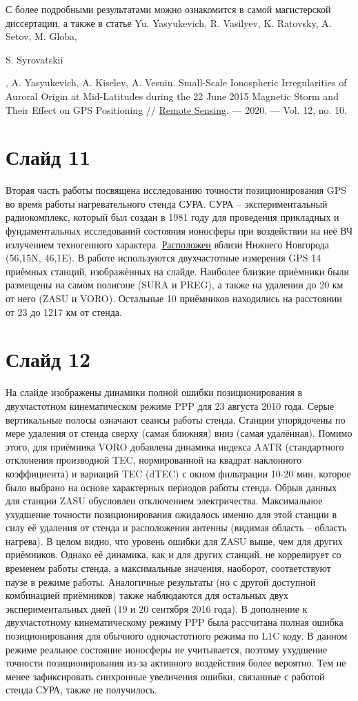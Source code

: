 \documentclass[a4paper,14pt]{extarticle}
\begin{document}
С более подробными результатами можно ознакомится в самой магистерской диссертации, а также в статье Yu. Yasyukevich, R. Vasilyev, K. Ratovsky, A. Setov, M. Globa, \begin{bf}S. Syrovatskii\end{bf}, A. Yasyukevich, A. Kiselev, A. Vesnin. Small-Scale Ionospheric Irregularities of Auroral Origin at Mid-Latitudes during the 22 June 2015 Magnetic Storm and Their Effect on GPS Positioning // \href{http://dx.doi.org/10.3390/rs12101579}{Remote Sensing}. --- 2020. --- Vol. 12, no. 10. 

\section*{Слайд 11}
Вторая часть работы посвящена исследованию точности позиционирования GPS во время работы нагревательного стенда СУРА.
СУРА -- экспериментальный радиокомплекс, который был создан в 1981 году для проведения прикладных и фундаментальных исследований состояния ионосферы при воздействии на неё ВЧ излучением техногенного характера.
\href{https://clck.ru/NfWnc}{Расположен} вблизи Нижнего Новгорода (56,15\degree N, 46,1\degree E).
В работе используются двухчастотные измерения GPS 14 приёмных станций, изображённых на слайде.
Наиболее близкие приёмники были размещены на самом полигоне (SURA и PREG), а также на удалении до 20 км от него (ZASU и VORO).
Остальные 10 приёмников находились на расстоянии от 23 до 1217 км от стенда.

\section*{Слайд 12}
На слайде изображены динамики полной ошибки позиционирования в двухчастотном кинематическом режиме PPP для 23 августа 2010 года.
Серые вертикальные полосы означают сеансы работы стенда.
Станции упорядочены по мере удаления от стенда сверху (самая ближняя) вниз (самая удалённая).
Помимо этого, для приёмника VORO добавлена динамика индекса AATR (стандартного отклонения производной TEC, нормированной на квадрат наклонного коэффициента) и вариаций TEC (dTEC) с окном фильтрации 10-20 мин, которое было выбрано на основе характерных периодов работы стенда. 
Обрыв данных для станции ZASU обусловлен отключением электричества.
Максимальное ухудшение точности позиционирования ожидалось именно для этой станции в силу её удаления от стенда и расположения антенны (видимая область -- область нагрева).
В целом видно, что уровень ошибки для ZASU выше, чем для других приёмников.
Однако её динамика, как и для других станций, не коррелирует со временем работы стенда, а максимальные значения, наоборот, соответствуют паузе в режиме работы.
Аналогичные результаты (но с другой доступной комбинацией приёмников) также наблюдаются для остальных двух экспериментальных дней (19 и 20 сентября 2016 года).
В дополнение к двухчастотному кинематическому режиму PPP была рассчитана полная ошибка позиционирования для обычного одночастотного режима по L1C коду.
В данном режиме реальное состояние ионосферы не учитывается, поэтому ухудшение точности позиционирования из-за активного воздействия более вероятно.
Тем не менее зафиксировать синхронные увеличения ошибки, связанные с работой стенда СУРА, также не получилось.
\end{document}
